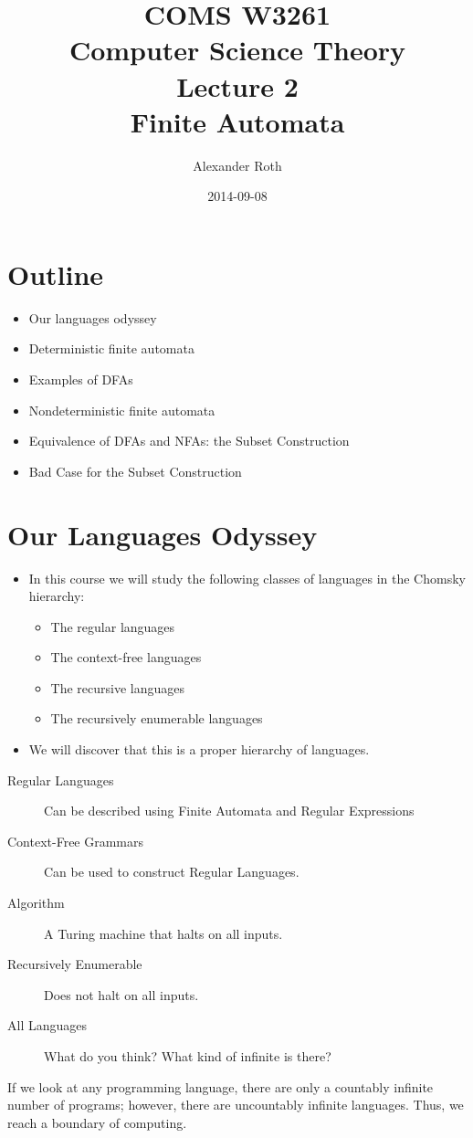 \documentclass[]{article}
\begin{document}
\title{COMS W3261 \\ Computer Science Theory \\ Lecture 2\\ Finite Automata}
\author{Alexander Roth}
\date{2014-09-08}
\maketitle

\section*{Outline}
  \begin{itemize}
    \item Our languages odyssey
    \item Deterministic finite automata
    \item Examples of DFAs
    \item Nondeterministic finite automata
    \item Equivalence of DFAs and NFAs: the Subset Construction
    \item Bad Case for the Subset Construction
  \end{itemize}

\section{Our Languages Odyssey}
  \begin{itemize}
    \item In this course we will study the following classes of languages in the
    Chomsky hierarchy:
      \begin{itemize}
        \item The regular languages
        \item The context-free languages
        \item The recursive languages
        \item The recursively enumerable languages
      \end{itemize}
    \item We will discover that this is a proper hierarchy of languages.
  \end{itemize}
  \begin{description}
    \item[Regular Languages] Can be described using Finite Automata and
    Regular Expressions
    \item[Context-Free Grammars] Can be used to construct Regular Languages.
    \item[Algorithm] A Turing machine that halts on all inputs.
    \item[Recursively Enumerable] Does not halt on all inputs.
    \item[All Languages] What do you think? What kind of infinite is there?
  \end{description}
  If we look at any programming language, there are only a countably infinite
  number of programs; however, there are uncountably infinite languages. Thus,
  we reach a boundary of computing.
\end{document}
